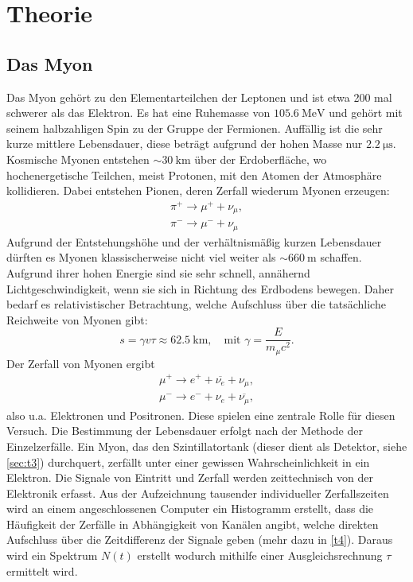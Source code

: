 \section{Theorie}
\label{sec:Theorie}

\subsection{Das Myon}
\label{sec:t1}
Das Myon gehört zu den Elementarteilchen der Leptonen und ist etwa 200 mal 
schwerer als das Elektron. Es hat eine Ruhemasse von $\qty{105.6}{\mega\electronvolt}$
und gehört mit seinem halbzahligen Spin zu der Gruppe der Fermionen. Auffällig ist 
die sehr kurze mittlere Lebensdauer, diese beträgt aufgrund der hohen Masse 
nur $\qty{2.2}{\micro\second}$. \cite{Myon}
Kosmische Myonen entstehen $\sim \qty{30}{\kilo\meter}$ über der Erdoberfläche, 
wo hochenergetische Teilchen, meist Protonen, mit den Atomen der Atmosphäre 
kollidieren. Dabei entstehen Pionen, deren Zerfall wiederum Myonen erzeugen:
\begin{align*}
    \pi^+ \longrightarrow \mu^+ + \nu_\mu, \\
    \pi^- \longrightarrow \mu^- + \nu_\mu
\end{align*}
Aufgrund der Entstehungshöhe und der verhältnismäßig kurzen Lebensdauer dürften
es Myonen klassischerweise nicht viel weiter als $\sim \qty{660}{\meter}$
schaffen. Aufgrund ihrer hohen Energie sind sie sehr schnell, annähernd 
Lichtgeschwindigkeit, wenn sie sich in Richtung des Erdbodens bewegen. Daher
bedarf es relativistischer Betrachtung, welche Aufschluss über
die tatsächliche Reichweite von Myonen gibt:
\begin{equation*}
    s = \gamma v \tau \approx \qty{62.5}{\kilo\meter}, \quad \text{mit } \gamma = \frac{E}{m_\mu c^2}.
\end{equation*}
Der Zerfall von Myonen ergibt
\begin{align*}
    \mu^+ \longrightarrow e^+ + \overline{\nu_e} + \nu_\mu, \\
    \mu^- \longrightarrow e^- + \nu_e + \overline{\nu_\mu},
\end{align*}
also u.a. Elektronen und Positronen. Diese spielen eine zentrale Rolle für 
diesen Versuch. Die Bestimmung der Lebensdauer erfolgt nach der Methode der 
Einzelzerfälle. Ein Myon, das den Szintillatortank (dieser dient als Detektor, 
siehe \autoref{sec:t3}) durchquert, zerfällt unter einer gewissen Wahrscheinlichkeit 
in ein Elektron. Die Signale von Eintritt und Zerfall  werden zeittechnisch 
von der Elektronik erfasst. Aus der Aufzeichnung tausender individueller 
Zerfallszeiten wird an einem angeschlossenen Computer ein Histogramm erstellt, 
dass die Häufigkeit der Zerfälle in Abhängigkeit von Kanälen angibt, welche 
direkten Aufschluss über die Zeitdifferenz der Signale geben (mehr dazu in 
\autoref{t4}). Daraus wird ein Spektrum $N(t)$ erstellt wodurch mithilfe einer 
Ausgleichsrechnung $\tau$ ermittelt wird. 


